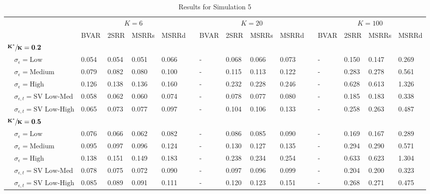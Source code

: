 \begin{table}[!tbp]
\caption{Results for Simulation 5\label{s1_table}} 
\begin{center}
\begin{tabular}{lllllcllllcllll}
\hline\hline
\multicolumn{1}{l}{\bfseries }&\multicolumn{4}{c}{\bfseries $K=6$}&\multicolumn{1}{c}{\bfseries }&\multicolumn{4}{c}{\bfseries $K=20$}&\multicolumn{1}{c}{\bfseries }&\multicolumn{4}{c}{\bfseries $K=100$}\tabularnewline
\cline{2-5} \cline{7-10} \cline{12-15}
\multicolumn{1}{l}{}&\multicolumn{1}{c}{BVAR}&\multicolumn{1}{c}{2SRR}&\multicolumn{1}{c}{MSRRs}&\multicolumn{1}{c}{MSRRd}&\multicolumn{1}{c}{}&\multicolumn{1}{c}{BVAR}&\multicolumn{1}{c}{2SRR}&\multicolumn{1}{c}{MSRRs}&\multicolumn{1}{c}{MSRRd}&\multicolumn{1}{c}{}&\multicolumn{1}{c}{BVAR}&\multicolumn{1}{c}{2SRR}&\multicolumn{1}{c}{MSRRs}&\multicolumn{1}{c}{MSRRd}\tabularnewline
\hline
{\bfseries $\mathbf{\sfrac{K^*}{K}=0.2}$}&&&&&&&&&&&&&&\tabularnewline
~~$\sigma_{\epsilon} =\text{Low}$& 0.054& 0.054& 0.051& 0.066&&-& 0.068& 0.066& 0.073&&-& 0.150& 0.147& 0.269\tabularnewline
~~$\sigma_{\epsilon} =\text{Medium}$& 0.079& 0.082& 0.080& 0.100&&-& 0.115& 0.113& 0.122&&-& 0.283& 0.278& 0.561\tabularnewline
~~$\sigma_{\epsilon} =\text{High}$& 0.126& 0.138& 0.136& 0.160&&-& 0.232& 0.228& 0.246&&-& 0.628& 0.613& 1.326\tabularnewline
~~$\sigma_{\epsilon,t} = \text{SV Low-Med}$& 0.058& 0.062& 0.060& 0.074&&-& 0.078& 0.077& 0.080&&-& 0.185& 0.183& 0.338\tabularnewline
~~$\sigma_{\epsilon,t}  = \text{SV Low-High}$& 0.065& 0.073& 0.077& 0.097&&-& 0.104& 0.106& 0.133&&-& 0.258& 0.263& 0.487\tabularnewline
\hline
{\bfseries $\mathbf{\sfrac{K^*}{K}=0.5}$}&&&&&&&&&&&&&&\tabularnewline
~~$\sigma_{\epsilon} =\text{Low}$& 0.076& 0.066& 0.062& 0.082&&-& 0.086& 0.085& 0.090&&-& 0.169& 0.167& 0.289\tabularnewline
~~$\sigma_{\epsilon} =\text{Medium}$& 0.095& 0.097& 0.096& 0.124&&-& 0.130& 0.127& 0.135&&-& 0.294& 0.290& 0.571\tabularnewline
~~$\sigma_{\epsilon} =\text{High}$& 0.138& 0.151& 0.149& 0.183&&-& 0.238& 0.234& 0.254&&-& 0.633& 0.623& 1.304\tabularnewline
~~$\sigma_{\epsilon,t} = \text{SV Low-Med}$& 0.078& 0.075& 0.072& 0.090&&-& 0.097& 0.096& 0.099&&-& 0.204& 0.200& 0.323\tabularnewline
~~$\sigma_{\epsilon,t}  = \text{SV Low-High}$& 0.085& 0.089& 0.091& 0.111&&-& 0.120& 0.123& 0.151&&-& 0.268& 0.271& 0.475\tabularnewline

\end{tabular}
\end{center}
\end{table}
